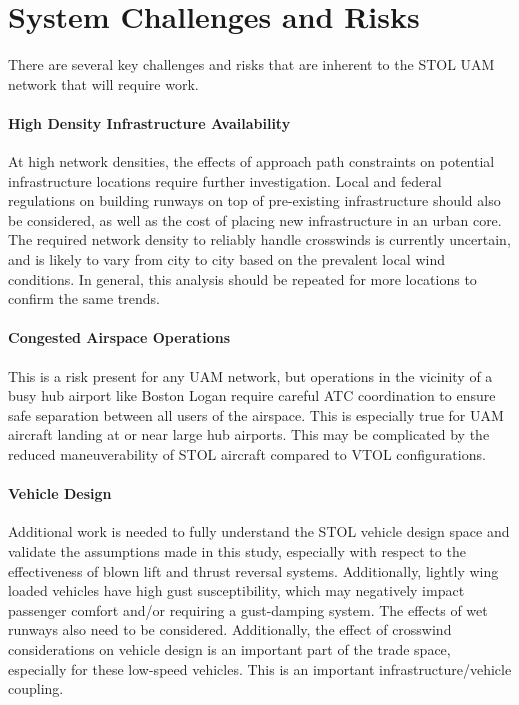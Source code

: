 \documentclass[]{aiaa-tc}%
\begin{document}
\section{System Challenges and Risks}
There are several key challenges and risks that are inherent to the STOL UAM network that will require work.
\paragraph{High Density Infrastructure Availability}
At high network densities, the effects of approach path constraints on potential infrastructure locations require further investigation.  Local and federal regulations on building runways on top of pre-existing infrastructure should also be considered, as well as the cost of placing new infrastructure in an urban core. The required network density to reliably handle crosswinds is currently uncertain, and is likely to vary from city to city based on the prevalent local wind conditions.  In general, this analysis should be repeated for more locations to confirm the same trends. 
\paragraph{Congested Airspace Operations}
This is a risk present for any UAM network, but operations in the vicinity of a busy hub airport like Boston Logan require careful ATC coordination to ensure safe separation between all users of the airspace.   This is especially true for UAM aircraft landing at or near large hub airports.  This may be complicated by the reduced maneuverability of STOL aircraft compared to VTOL configurations. 
\paragraph{Vehicle Design} 
Additional work is needed to fully understand the STOL vehicle design space and validate the assumptions made in this study, especially with respect to the effectiveness of blown lift and thrust reversal systems.  Additionally, lightly wing loaded vehicles have high gust susceptibility, which may negatively impact passenger comfort and/or requiring a gust-damping system.  The effects of wet runways also need to be considered.  Additionally, the effect of crosswind considerations on vehicle design is an important part of the trade space, especially for these low-speed vehicles.  This is an important infrastructure/vehicle coupling. 
\end{document}
